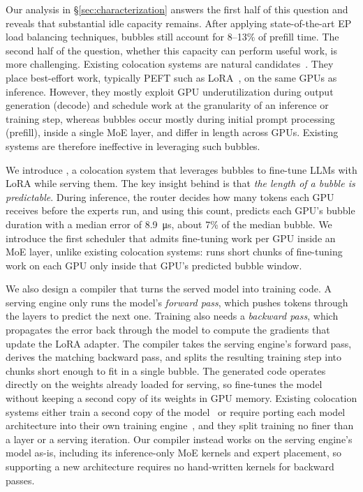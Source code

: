 Our analysis in \S\ref{sec:characterization} answers the first half of this question and reveals that substantial idle capacity remains.
After applying state-of-the-art \ac{EP} load balancing techniques, bubbles still account for 8--13\% of prefill time.
The second half of the question, whether this capacity can perform useful work, is more challenging.
Existing colocation systems are natural candidates~\cite{flexllm,llmstation,harli,deltaserve}.
They place best-effort work, typically \ac{PEFT} such as \ac{LoRA}~\cite{lora}, on the same GPUs as inference.
However, they mostly exploit GPU underutilization during output generation (decode) and schedule work at the granularity of an inference or training step, whereas bubbles occur mostly during initial prompt processing (prefill), inside a single \ac{MoE} layer, and differ in length across GPUs.
Existing systems are therefore ineffective in leveraging such bubbles.

We introduce \sys, a colocation system that leverages bubbles to fine-tune \acp{LLM} with \ac{LoRA} while serving them.
The key insight behind \sys is that \emph{the length of a bubble is predictable}.
During inference, the router decides how many tokens each GPU receives before the experts run, and using this count, \sys predicts each GPU's bubble duration with a median error of \SI{8.9}{\micro\second}, about 7\% of the median bubble.
We introduce the first scheduler that admits fine-tuning work per GPU inside an \ac{MoE} layer, unlike existing colocation systems: \sys runs short chunks of fine-tuning work on each GPU only inside that GPU's predicted bubble window.

We also design a compiler that turns the served model into training code.
A serving engine only runs the model's \emph{forward pass}, which pushes tokens through the layers to predict the next one.
Training also needs a \emph{backward pass}, which propagates the error back through the model to compute the gradients that update the \ac{LoRA} adapter.
The compiler takes the serving engine's forward pass, derives the matching backward pass, and splits the resulting training step into chunks short enough to fit in a single bubble.
The generated code operates directly on the weights already loaded for serving, so \sys fine-tunes the model without keeping a second copy of its weights in GPU memory.
Existing colocation systems either train a second copy of the model~\cite{harli} or require porting each model architecture into their own training engine~\cite{flexllm,llmstation}, and they split training no finer than a layer or a serving iteration.
Our compiler instead works on the serving engine's model as-is, including its inference-only \ac{MoE} kernels and expert placement, so supporting a new architecture requires no hand-written kernels for backward passes.

